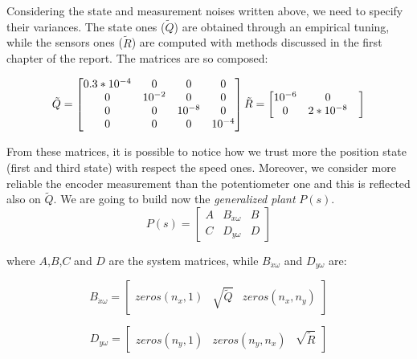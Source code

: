 Considering the state and measurement noises written above, we need to specify their variances. The state ones ($\tilde{Q}$) are obtained through an empirical tuning, while the sensors ones ($\tilde{R}$) are computed with methods discussed in the first chapter of the report. The matrices are so composed:

\begin{equation}
	\tilde{Q}=
	\begin{bmatrix}
		0.3*10^{-4} & 0 & 0 & 0 \\
		0 & 10^{-2} & 0 & 0 \\
		0 & 0 & 10^{-8} & 0 \\
		0 & 0 & 0 & 10^{-4}
	\end{bmatrix}
	\\
	\tilde{R}=
	\begin{bmatrix}
		10^{-6} & 0\\
		0 & 2*10^{-8} & 
	\end{bmatrix}	
\end{equation}

From these matrices, it is possible to notice how we trust more the position state (first and third state) with respect the speed ones. Moreover, we consider more reliable the encoder measurement than the potentiometer one and this is reflected also on $\tilde{Q}$. 
\newline
We are going to build now the \textit{generalized plant} $P(s)$.
\begin{equation}
	P(s)
	=
	\left[
	\begin{array}{c|cc}
		A & B_{\dot{x}\omega} & B \\
		\hline
		C & D_{y\omega} & D	
	\end{array}
	\right]
\label{P(s)}
\end{equation}

where $A$,$B$,$C$ and $D$ are the system matrices, while $B_{\dot{x}\omega}$ and $D_{y\omega}$ are:

\begin{equation}
	B_{\dot{x}\omega}=
	\begin{bmatrix}
		zeros(n_x,1) & \sqrt{\tilde{Q}} & zeros (n_x,n_y)
	\end{bmatrix}
\end{equation}

\begin{equation}
	D_{y\omega}=
	\begin{bmatrix}
		zeros(n_y,1) & zeros (n_y,n_x) & \sqrt{\tilde{R}}
	\end{bmatrix}
\end{equation}

